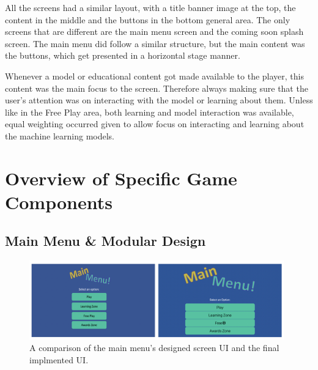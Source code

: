 	All the screens had a similar layout, with a title banner image at the top, the content in the middle and the buttons in the bottom general area. The only screens that are different are the main menu screen and the coming soon splash screen. The main menu did follow a similar structure, but the main content was the buttons, which get presented in a horizontal stage manner.
	
	Whenever a model or educational content got made available to the player, this content was the main focus to the screen. Therefore always making sure that the user's attention was on interacting with the model or learning about them. Unless like in the Free Play area, both learning and model interaction was available, equal weighting occurred given to allow focus on interacting and learning about the machine learning models.
		
	
	
		
	\section{Overview of Specific Game Components}
		\label{sec:overview_game_components}
		
	
	\subsection{Main Menu \& Modular Design}
	\begin{figure}[t]
		\begin{center}
			\includegraphics[width=11cm]{graphics/main_menu.png}
			\caption{A comparison of the main menu's designed screen UI and the final implmented UI.}
			\label{fig:ui_mm}
		\end{center}
		
	\end{figure}

